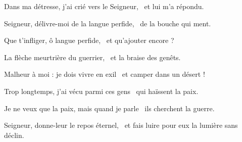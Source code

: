 \item Dans ma détresse, j'ai crié vers le Seigneur,~\psstar{} et lui m'a répondu.

\item Seigneur, délivre-moi de la langue perfide,~\psstar{} de la bouche qui ment.

\item Que t'infliger, ô langue perfide,~\psstar{} et qu'ajouter encore ?

\item La flèche meurtrière du guerrier,~\psstar{} et la braise des genêts.

\item Malheur à moi : je dois vivre en exil~\psstar{} et camper dans un désert !

\item Trop longtemps, j'ai vécu parmi ces gens~\psstar{} qui haïssent la paix.

\item Je ne veux que la paix, mais quand je parle~\psstar{} ils cherchent la guerre.

\item Seigneur, donne-leur le repos éternel,~\psstar{} et fais luire pour eux la lumière sans déclin.
